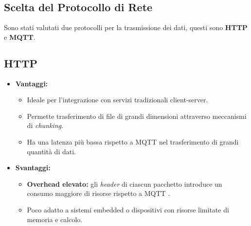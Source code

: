 \begin{samepage}
\section{Scelta del Protocollo di Rete}
Sono stati valutati due protocolli per la trasmissione dei dati, questi sono \textbf{HTTP} e \textbf{MQTT}.

\subsection{HTTP}
\begin{itemize}
	\item \textbf{Vantaggi:}
	\begin{itemize}
		\item Ideale per l'integrazione con servizi tradizionali client-server.
		\item Permette trasferimento di file di grandi dimensioni attraverso meccanismi di \textit{chunking}.
		\item Ha una latenza più bassa rispetto a MQTT nel trasferimento di grandi quantità di dati.


	\end{itemize}
	\item \textbf{Svantaggi:}
	\begin{itemize}
		\item \textbf{Overhead elevato:} gli \textit{header} di ciascun pacchetto introduce un consumo maggiore di risorse rispetto a MQTT \cite{mqtthttp}.
		\item Poco adatto a sistemi embedded o dispositivi con risorse limitate di memoria e calcolo.
	\end{itemize}
\end{itemize}
\end{samepage}
